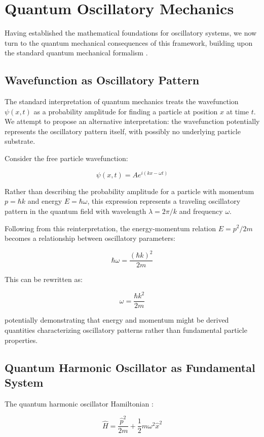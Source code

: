 \documentclass[11pt]{article}
\theoremstyle{remark}
\begin{document}
\section{Quantum Oscillatory Mechanics}

Having established the mathematical foundations for oscillatory systems, we now turn to the quantum mechanical consequences of this framework, building upon the standard quantum mechanical formalism \cite{dirac1958quantum}.

\subsection{Wavefunction as Oscillatory Pattern}

The standard interpretation of quantum mechanics treats the wavefunction $\psi(x,t)$ as a probability amplitude for finding a particle at position $x$ at time $t$. We attempt to propose an alternative interpretation: the wavefunction potentially represents the oscillatory pattern itself, with possibly no underlying particle substrate.

Consider the free particle wavefunction:

$$\psi(x,t) = A e^{i(kx - \omega t)}$$

Rather than describing the probability amplitude for a particle with momentum $p = \hbar k$ and energy $E = \hbar \omega$, this expression represents a traveling oscillatory pattern in the quantum field with wavelength $\lambda = 2\pi/k$ and frequency $\omega$.

Following from this reinterpretation, the energy-momentum relation $E = p^2/2m$ becomes a relationship between oscillatory parameters:

$$\hbar \omega = \frac{(\hbar k)^2}{2m}$$

This can be rewritten as:

$$\omega = \frac{\hbar k^2}{2m}$$

potentially demonstrating that energy and momentum might be derived quantities characterizing oscillatory patterns rather than fundamental particle properties.

\subsection{Quantum Harmonic Oscillator as Fundamental System}

The quantum harmonic oscillator Hamiltonian \cite{dirac1958quantum}:

$$\hat{H} = \frac{\hat{p}^2}{2m} + \frac{1}{2}m\omega^2\hat{x}^2$$
\end{document}
